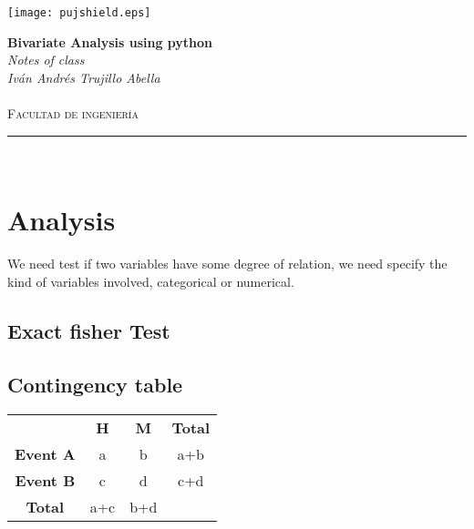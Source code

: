 \documentclass[10pt,a4paper]{article}
\author{Iván Andrés Trujillo }
\begin{document}
\newcommand{\HRule}{\rule{\linewidth}{0.5mm}}


\graphicspath{{/home/ces/Pictures/puj/}}
\texttt{[image: pujshield.eps]}\\[0.5cm] 

\begin{center} 
\textbf{\LARGE Bivariate Analysis using python }\\[0.2cm]
\emph{\LARGE Notes of class}\\[0.3cm] 
\emph{Iván Andrés Trujillo Abella} \\
\textsc{\Large 
}\\[0.2cm] 
\textsc{\large Facultad de ingeniería}\\[0.5cm] 
\HRule \\[0.4cm]
\end{center}
\vspace{1cm}
\section{Analysis}

We need test if two variables have some degree of relation, we need specify the kind of variables involved, categorical or numerical.

\subsection{Exact fisher Test}







\subsection{Contingency table}

\begin{table}[h!]
\begin{tabular}{cccc}
                                      & \textbf{H} & \textbf{M} & \textbf{Total} \\ \cline{2-4} 
\multicolumn{1}{c|}{\textbf{Event A}} & a          & b          & a+b            \\
\multicolumn{1}{c|}{\textbf{Event B}} & c          & d          & c+d            \\
\multicolumn{1}{c|}{\textbf{Total}}   & a+c        & b+d        &               
\end{tabular}
\end{table}
\end{document}
